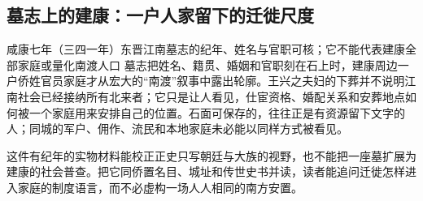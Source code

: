 \subsection{墓志上的建康：一户人家留下的迁徙尺度}
\begin{event}{}{咸康七年（三四一年）}{东晋江南}{墓志的纪年、姓名与官职可核；它不能代表建康全部家庭或量化南渡人口}
墓志把姓名、籍贯、婚姻和官职刻在石上时，建康周边一户侨姓官员家庭才从宏大的“南渡”叙事中露出轮廓。王兴之夫妇的下葬并不说明江南社会已经接纳所有北来者；它只是让人看见，仕宦资格、婚配关系和安葬地点如何被一个家庭用来安排自己的位置。石面可保存的，往往正是有资源留下文字的人；同城的军户、佣作、流民和本地家庭未必能以同样方式被看见。

这件有纪年的实物材料能校正正史只写朝廷与大族的视野，也不能把一座墓扩展为建康的社会普查。把它同侨置名目、城址和传世史书并读，读者能追问迁徙怎样进入家庭的制度语言，而不必虚构一场人人相同的南方安置。
\end{event}